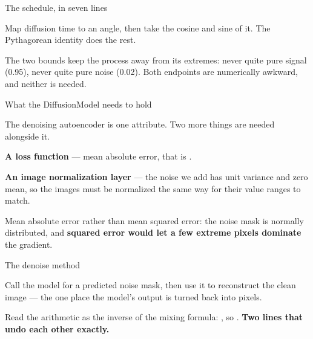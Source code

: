 \documentclass[aspectratio=169,11pt,t]{beamer}
\begin{document}
\begin{frame}[shrink=25]{The schedule, in seven lines}
{\fontsize{9.4}{12.6}\selectfont\color{fg2}Map diffusion time to an angle, then take the cosine and sine of it. The Pythagorean identity does the rest.\par}\vskip 4pt
{\fontsize{9.4}{12.6}\selectfont\color{fg2}The two bounds keep the process away from its extremes: never quite pure signal (0.95), never quite pure noise (0.02). Both endpoints are numerically awkward, and neither is needed.\par}\vskip 4pt
\end{frame}

\begin{frame}[shrink=25]{What the DiffusionModel needs to hold}
{\fontsize{9.4}{12.6}\selectfont\color{fg2}The denoising autoencoder is one attribute. Two more things are needed alongside it.\par}\vskip 4pt
\begin{ibullets}
\item \textbf{A loss function} --- mean absolute error, that is .
\item \textbf{An image normalization layer} --- the noise we add has unit variance and zero mean, so the images must be normalized the same way for their value ranges to match.
\end{ibullets}
{\fontsize{9.4}{12.6}\selectfont\color{fg2}Mean absolute error rather than mean squared error: the noise mask is normally distributed, and \textbf{squared error would let a few extreme pixels dominate} the gradient.\par}\vskip 4pt
\end{frame}

\begin{frame}[shrink=25]{The denoise method}
{\fontsize{9.4}{12.6}\selectfont\color{fg2}Call the model for a predicted noise mask, then use it to reconstruct the clean image --- the one place the model's output is turned back into pixels.\par}\vskip 4pt
{\fontsize{9.4}{12.6}\selectfont\color{fg2}Read the arithmetic as the inverse of the mixing formula: , so . \textbf{Two lines that undo each other exactly.}\par}\vskip 4pt
\end{frame}
\end{document}

